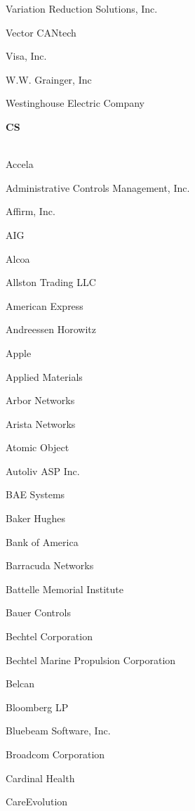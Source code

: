 \documentclass[twoside]{article}
\begin{document}
\begin{center}
\begin{multicols}{5}
\begin{FlushLeft}
\begin{compactitem}
\item Variation Reduction Solutions, Inc.
\item Vector CANtech
\item Visa, Inc.
\item W.W. Grainger, Inc
\item Westinghouse Electric Company
\end{compactitem}
        \end{FlushLeft}
        \vspace{1em}
        {\fontsize{14}{16}\selectfont \bf CS}\\
        \vspace{-1em}
        ~\hrulefill~
        \vspace{-.9em}
        \begin{FlushLeft}
        \begin{compactitem}
        \item Accela
\item Administrative Controls Management, Inc.
\item Affirm, Inc.
\item AIG
\item Alcoa
\item Allston Trading LLC
\item American Express
\item Andreessen Horowitz
\item Apple
\item Applied Materials
\item Arbor Networks
\item Arista Networks
\item Atomic Object
\item Autoliv ASP Inc.
\item BAE Systems
\item Baker Hughes
\item Bank of America
\item Barracuda Networks
\item Battelle Memorial Institute
\item Bauer Controls
\item Bechtel Corporation
\item Bechtel Marine Propulsion Corporation
\item Belcan
\item Bloomberg LP
\item Bluebeam Software, Inc.
\item Broadcom Corporation
\item Cardinal Health
\item CareEvolution

\end{compactitem}
\end{FlushLeft}
\end{multicols}
\end{center}
\end{document}
